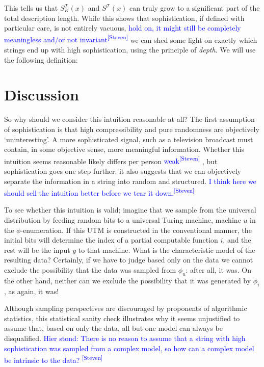 \documentclass{style/llncs}
\newcommand{\T}{\mathscr T}
\newcommand{\sdr}[1]{\textcolor{blue}{\small #1\textsuperscript{[Steven]} }}
\begin{document}
{\noindent This tells us that $S^\T_K(x)$ and $S^\T(x)$ can truly grow to a significant part of the total description length. While this shows that sophistication, if defined with particular care, is not entirely vacuous, \sdr{hold on, it might still be completely meaningless and/or not invariant} we can shed some light on exactly which strings end up with high sophistication, using the principle of \emph{depth}. We will use the following definition:

}

\section{Discussion}
\label{section:conclusion}


So why should we consider this intuition reasonable at all? The first assumption of sophistication is that high compressibility and pure randomness are objectively `uninteresting'. A more sophisticated signal, such as a television broadcast must contain, in some objective sense, more meaningful information. Whether this intuition seems reasonable likely differs per person \sdr{weak}, but sophistication goes one step further: it also suggests that we can objectively separate the information in a string into random and structured. \sdr{I think here we should sell the intuition better before we tear it down.}

To see whether this intuition is valid; imagine that we sample from the universal distribution by feeding random bits to a universal Turing machine, machine $u$ in the $\phi$-enumeration. If this UTM is constructed in the conventional manner, the initial bits will determine the index of a partial computable function $i$, and the rest will be the input $y$ to that machine. What is the characteristic model of the resulting data? Certainly, if we have to judge based only on the data we cannot exclude the possibility that the data was sampled from $\phi_u$: after all, it was.  On the other hand, neither can we exclude the possibility that it was generated by $\phi_i$, as again, it was! 

Although sampling perspectives are discouraged by proponents of algorithmic statistics, this statistical sanity check illustrates why it seems unjustified to assume that, based on only the data, all but one model can always be disqualified. \sdr{Hier stond: There is no reason to assume that a string with high sophistication was sampled from a complex model, so how can a complex model be intrinsic to the data? \footnotemark}
\end{document}

